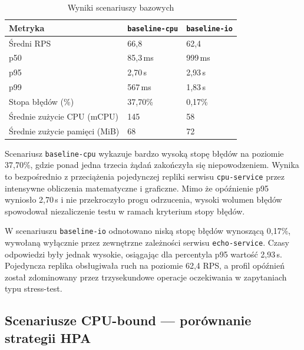 \begin{table}[H]
  \centering
  \begin{tabularx}{\textwidth}{|l|X|X|}
    \hline
    \textbf{Metryka} & \texttt{baseline-cpu} & \texttt{baseline-io} \\
    \hline
    Średni RPS & 66,8 & 62,4 \\
    p50 & 85,3\,ms & 999\,ms \\
    p95 & 2,70\,s & 2,93\,s \\
    p99 & 567\,ms & 1,83\,s \\
    Stopa błędów (\%) & 37,70\% & 0,17\% \\
    Średnie zużycie CPU (mCPU) & 145 & 58 \\
    Średnie zużycie pamięci (MiB) & 68 & 72 \\
    \hline
  \end{tabularx}
  \caption{Wyniki scenariuszy bazowych}
  \label{tab:baseline-results}
\end{table}

Scenariusz \texttt{baseline-cpu} wykazuje bardzo wysoką stopę błędów na poziomie 37,70\%, gdzie ponad jedna trzecia żądań zakończyła się niepowodzeniem. Wynika to bezpośrednio z przeciążenia pojedynczej repliki serwisu \texttt{cpu-service} przez intensywne obliczenia matematyczne i graficzne. Mimo że opóźnienie p95 wyniosło 2,70\,s i nie przekroczyło progu odrzucenia, wysoki wolumen błędów spowodował niezaliczenie testu w ramach kryterium stopy błędów.

W scenariuszu \texttt{baseline-io} odnotowano niską stopę błędów wynoszącą 0,17\%, wywołaną wyłącznie przez zewnętrzne zależności serwisu \texttt{echo-service}. Czasy odpowiedzi były jednak wysokie, osiągając dla percentyla p95 wartość 2,93\,s. Pojedyncza replika obsługiwała ruch na poziomie 62,4 RPS, a profil opóźnień został zdominowany przez trzysekundowe operacje oczekiwania w zapytaniach typu stress-test.

\subsection{Scenariusze CPU-bound — porównanie strategii HPA}

